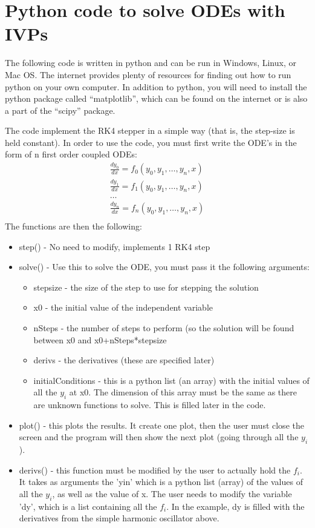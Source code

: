 \section{Python code to solve ODEs with IVPs}
The following code is written in python and can be run in Windows, Linux, or Mac OS. The internet provides plenty of resources for finding out how to run python on your own computer. In addition to python, you will need to install the python package called ``matplotlib'', which can be found on the internet or is also a part of the ``scipy'' package.

The code implement the RK4 stepper in a simple way (that is, the step-size is held constant). In order to use the code, you must first write the ODE's in the form of n first order coupled ODEs:
\begin{align}
\frac{dy_0}{dx}=f_0(y_0,y_1,\dots ,y_n,x)\nonumber\\
\frac{dy_1}{dx}=f_1(y_0,y_1,\dots ,y_n,x)\nonumber\\
\dots\nonumber\\
\frac{dy_n}{dx}=f_n(y_0,y_1,\dots ,y_n,x)\nonumber\\
\end{align}
The functions are then the following:
\begin{itemize}
\item step() - No need to modify, implements 1 RK4 step
\item solve() - Use this to solve the ODE, you must pass it the following arguments:
\begin{itemize}
\item stepsize - the size of the step to use for stepping the solution
\item x0 - the initial value of the independent variable
\item nSteps - the number of steps to perform (so the solution will be found between x0 and x0+nSteps*stepsize
\item derivs - the derivatives (these are specified later)
\item initialConditions - this is a python list (an array) with the initial values of all the $y_i$ at x0. The dimension of this array must be the same as there are unknown functions to solve. This is filled later in the code.
\end{itemize}
\item plot() - this plots the results. It create one plot, then the user must close the screen and the program will then show the next plot (going through all the $y_i$).
\item derivs() - this function must be modified by the user to actually hold the $f_i$. It takes as arguments the 'yin' which is a python list (array) of the values of all the $y_i$, as well as the value of x. The user needs to modify the variable 'dy', which is a list containing all the $f_i$. In the example, dy is filled with the derivatives from the simple harmonic oscillator above.
\end{itemize}
